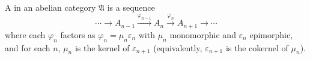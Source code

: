 A  in an abelian category $\mathfrak{A}$ is a sequence
$$\cdots \to A_{n-1} \xrightarrow{\varphi_{n-1}} A_n \xrightarrow{\varphi_n} A_{n+1} \to \cdots$$
where each $\varphi_n$ factors as $\varphi_n = \mu_n \varepsilon_n$ with $\mu_n$ monomorphic and $\varepsilon_n$ epimorphic, and for each $n$, $\mu_n$ is the kernel of $\varepsilon_{n+1}$ (equivalently, $\varepsilon_{n+1}$ is the cokernel of $\mu_n$).
